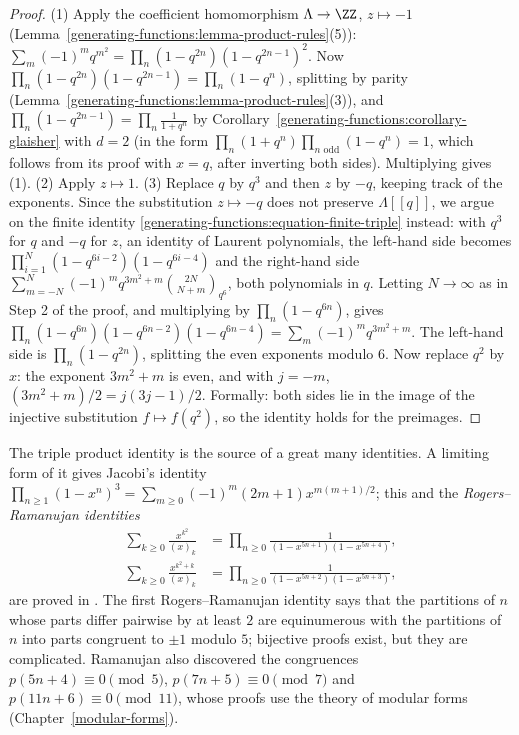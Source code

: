 \begin{proof}
(1) Apply the coefficient homomorphism $\Lambda \to \ZZ$, $z \mapsto -1$ (Lemma~\ref{generating-functions:lemma-product-rules}(5)): $\sum_m(-1)^mq^{m^2} = \prod_n(1 - q^{2n})(1 - q^{2n-1})^2$. Now
$\prod_n(1 - q^{2n})(1 - q^{2n-1}) = \prod_n(1 - q^n)$, splitting by parity (Lemma~\ref{generating-functions:lemma-product-rules}(3)), and
$\prod_n(1 - q^{2n-1}) = \prod_n\frac{1}{1 + q^n}$ by Corollary~\ref{generating-functions:corollary-glaisher} with $d = 2$ (in the form $\prod_n(1 + q^n)\prod_{n \text{ odd}}(1 - q^n) = 1$, which
follows from its proof with $x = q$, after inverting both sides). Multiplying gives (1).
(2) Apply $z \mapsto 1$.
(3) Replace $q$ by $q^3$ and then $z$ by $-q$, keeping track of the exponents. Since the substitution $z \mapsto -q$ does not preserve $\Lambda[[q]]$, we argue on the finite identity
\eqref{generating-functions:equation-finite-triple} instead: with $q^3$ for $q$ and $-q$ for $z$, an identity of Laurent polynomials, the left-hand side becomes
$\prod_{i=1}^{N}(1 - q^{6i-2})(1 - q^{6i-4})$ and the right-hand side $\sum_{m=-N}^{N}(-1)^mq^{3m^2+m}\binom{2N}{N + m}_{q^6}$, both polynomials in $q$. Letting $N \to \infty$ as in Step 2 of the proof,
and multiplying by $\prod_n(1 - q^{6n})$, gives $\prod_n(1 - q^{6n})(1 - q^{6n-2})(1 - q^{6n-4}) = \sum_m(-1)^mq^{3m^2+m}$. The left-hand side is $\prod_n(1 - q^{2n})$, splitting the even exponents
modulo $6$. Now replace $q^2$ by $x$: the exponent $3m^2 + m$ is even, and with $j = -m$, $(3m^2 + m)/2 = j(3j - 1)/2$. Formally: both sides lie in the image of the injective substitution
$f \mapsto f(q^2)$, so the identity holds for the preimages.
\end{proof}

\begin{remark}\label{generating-functions:remark-partition-identities}
The triple product identity is the source of a great many identities. A limiting form of it gives Jacobi's identity
$\prod_{n \geq 1}(1 - x^n)^3 = \sum_{m \geq 0}(-1)^m(2m + 1)x^{m(m+1)/2}$; this and the \emph{Rogers--Ramanujan identities}
\[
\begin{aligned}
\sum_{k \geq 0}\frac{x^{k^2}}{(x)_k} &= \prod_{n \geq 0}\frac{1}{(1 - x^{5n+1})(1 - x^{5n+4})},\\
\sum_{k \geq 0}\frac{x^{k^2+k}}{(x)_k} &= \prod_{n \geq 0}\frac{1}{(1 - x^{5n+2})(1 - x^{5n+3})},
\end{aligned}
\]
are proved in \cite{andrews-partitions}. The first Rogers--Ramanujan identity says that the partitions of $n$ whose parts differ pairwise by at least $2$ are equinumerous with the partitions of $n$
into parts congruent to $\pm 1$ modulo $5$; bijective proofs exist, but they are complicated. Ramanujan also discovered the congruences $p(5n + 4) \equiv 0 \pmod 5$, $p(7n + 5) \equiv 0 \pmod 7$ and
$p(11n + 6) \equiv 0 \pmod{11}$, whose proofs use the theory of modular forms (Chapter~\ref{modular-forms}).
\end{remark}

